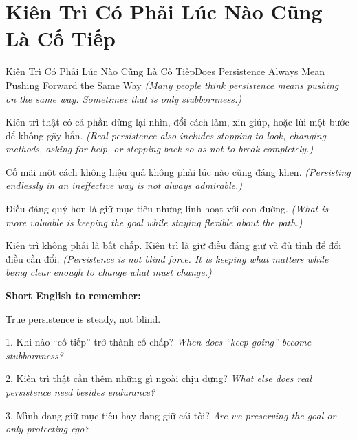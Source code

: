\section{Kiên Trì Có Phải Lúc Nào Cũng Là Cố Tiếp}
\begin{truyen}{Kiên Trì Có Phải Lúc Nào Cũng Là Cố Tiếp}{Does Persistence Always Mean Pushing Forward the Same Way}
\textit{(Many people think persistence means pushing on the same way. Sometimes that is only stubbornness.)}

Kiên trì thật có cả phần dừng lại nhìn, đổi cách làm, xin giúp, hoặc lùi một bước để không gãy hẳn.
\textit{(Real persistence also includes stopping to look, changing methods, asking for help, or stepping back so as not to break completely.)}

Cố mãi một cách không hiệu quả không phải lúc nào cũng đáng khen.
\textit{(Persisting endlessly in an ineffective way is not always admirable.)}

Điều đáng quý hơn là giữ mục tiêu nhưng linh hoạt với con đường.
\textit{(What is more valuable is keeping the goal while staying flexible about the path.)}
\end{truyen}

\begin{baihoc}
Kiên trì không phải là bất chấp. Kiên trì là giữ điều đáng giữ và đủ tỉnh để đổi điều cần đổi.
\textit{(Persistence is not blind force. It is keeping what matters while being clear enough to change what must change.)}
\end{baihoc}

\begin{ghinhoanh}
\textbf{Short English to remember:}

True persistence is steady, not blind.

\end{ghinhoanh}

\begin{tuhocnhanh}
1. Khi nào “cố tiếp” trở thành cố chấp? \textit{When does “keep going” become stubbornness?}

2. Kiên trì thật cần thêm những gì ngoài chịu đựng? \textit{What else does real persistence need besides endurance?}

3. Mình đang giữ mục tiêu hay đang giữ cái tôi? \textit{Are we preserving the goal or only protecting ego?}
\end{tuhocnhanh}
\ngancach

